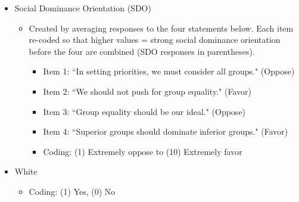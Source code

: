 \documentclass[12pt]{article}
\begin{document}
\begin{appendices}
\begin{refsection}
\begin{itemize}
	\item Social Dominance Orientation (SDO)
		\begin{itemize}
			\item Created by averaging responses to the four statements below. Each item re-coded so that higher values = strong social dominance orientation before the four are combined (SDO responses in parentheses). 
			\begin{itemize}
			\item Item 1: ``In setting priorities, we must consider all groups." (Oppose)
				\item Item 2: ``We should not push for group equality." (Favor)
				\item Item 3: ``Group equality should be our ideal." (Oppose)
				\item Item 4: ``Superior groups should dominate inferior groups." (Favor)
				\item Coding: (1) Extremely oppose to (10) Extremely favor
			\end{itemize}
		\end{itemize}
		
	\item White 
		\begin{itemize}
			\item Coding: (1) Yes, (0) No
		\end{itemize}
\end{itemize}







\end{refsection}
\end{appendices}
\end{document}

